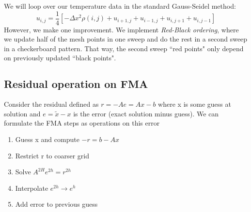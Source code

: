 \documentclass[11pt]{article}
\begin{document}

We will loop over our temperature data in the standard Gauss-Seidel method:
$$u_{i,j} = \frac{1}{4}[-\Delta x^2 \rho (i,j) + u_{i+1,j} + u_{i-1,j} + u_{i,j+1} + u_{i,j-1} ] $$
However, we make one improvement. We implement \emph{Red-Black ordering}, where we update half of the mesh points in one sweep and do the rest in a second sweep in a checkerboard pattern. That way, the second sweep ``red points" only depend on previously updated ``black points".

\subsection{Residual operation on FMA}

Consider the residual defined as $r= -Ae = Ax- b$ where x is some guess at solution and $e = \tilde{x} - x$ is the error (exact solution minus guess). We can formulate the FMA steps as operations on this error

\begin{enumerate}

\item Guess x and compute $-r=b-Ax$

\item Restrict r to coarser grid

\item Solve $A^{2H}e^{2h} = r^{2h}$

\item Interpolate $e^{2h} \rightarrow e^h$

\item Add error to previous guess

\end{enumerate}
\end{document}
